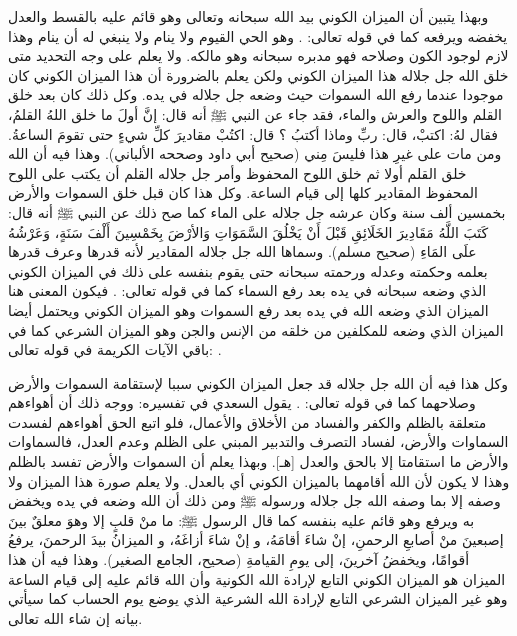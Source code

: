 وبهذا يتبين أن الميزان الكوني بيد الله سبحانه وتعالى وهو قائم عليه بالقسط والعدل يخفضه ويرفعه كما في قوله تعالى: 
\quranayah*[3][18]{\footnotesize \surahname*[3]}. وهو الحي القيوم ولا ينام ولا ينبغي له أن ينام وهذا لازم لوجود الكون وصلاحه فهو مدبره سبحانه وهو مالكه. ولا يعلم على وجه التحديد متى خلق الله جل جلاله هذا الميزان الكوني ولكن يعلم بالضرورة أن هذا الميزان الكوني كان موجودا عندما رفع الله السموات حيث وضعه جل جلاله في يده. وكل ذلك كان بعد خلق القلم واللوح والعرش والماء، فقد جاء عن النبي ﷺ أنه قال: إنَّ أولَ ما خلق اللهُ القلمُ، فقال لهُ: اكتبْ، قال: ربِّ وماذا أكتبُ ؟ قال: اكتُبْ مقاديرَ كلِّ شيءٍ حتى تقومَ الساعةُ. ومن مات على غيرِ هذا فليسَ مِني {\footnotesize (صحيح أبي داود وصححه الألباني)}. وهذا فيه أن الله خلق القلم أولا ثم خلق اللوح المحفوظ وأمر جل جلاله القلم أن يكتب على اللوح المحفوظ المقادير كلها إلى قيام الساعة. وكل هذا كان قبل خلق السموات والأرض بخمسين ألف سنة وكان عرشه جل جلاله على الماء كما صح ذلك عن النبي ﷺ أنه قال:  كَتَبَ اللَّهُ مَقَادِيرَ الخَلَائِقِ قَبْلَ أَنْ يَخْلُقَ السَّمَوَاتِ وَالأرْضَ بِخَمْسِينَ أَلْفَ سَنَةٍ، وَعَرْشُهُ علَى المَاءِ {\footnotesize (صحيح مسلم)}. وسماها الله جل جلاله المقادير لأنه قدرها وعرف قدرها بعلمه وحكمته وعدله ورحمته سبحانه حتى يقوم بنفسه على ذلك في الميزان الكوني الذي وضعه سبحانه في يده بعد رفع السماء كما في قوله تعالى: 
\quranayah*[55][7]{\footnotesize \surahname*[55]}. فيكون المعنى هنا الميزان الذي وضعه الله في يده بعد رفع السموات وهو الميزان الكوني ويحتمل أيضا الميزان الذي وضعه للمكلفين من خلقه من الإنس والجن وهو الميزان الشرعي كما في باقي الآيات الكريمة في قوله تعالى: 
\quranayah*[55][8-9]{\footnotesize \surahname*[55]}.

وكل هذا فيه أن الله جل جلاله قد جعل الميزان الكوني سببا لإستقامة السموات والأرض وصلاحهما كما في قوله تعالى:
\quranayah*[23][71]{\footnotesize \surahname*[23]}. يقول السعدي في تفسيره:
ووجه ذلك أن أهواءهم متعلقة بالظلم والكفر والفساد من الأخلاق والأعمال، فلو اتبع الحق أهواءهم لفسدت السماوات والأرض، لفساد التصرف والتدبير المبني على الظلم وعدم العدل، فالسماوات والأرض ما استقامتا إلا بالحق والعدل [هـ]. وبهذا يعلم أن السموات والأرض تفسد بالظلم وهذا لا يكون لأن الله أقامهما بالميزان الكوني أي بالعدل. ولا يعلم صورة هذا الميزان ولا وصفه إلا بما وصفه الله جل جلاله ورسوله ﷺ ومن ذلك أن الله وضعه في يده ويخفض به ويرفع وهو قائم عليه بنفسه كما قال الرسول ﷺ: 
ما منْ قلبٍ إلا وهوَ معلقٌ بينَ إصبعينَ منْ أصابعِ الرحمنِ، إنْ شاءَ أقامَهُ، و إنْ شاءَ أزاغَهُ، و الميزانُ بيدَ الرحمنَ، يرفعُ أقوامًا، ويخفضُ آخرينَ، إلى يومِ القيامةِ {\footnotesize (صحيح، الجامع الصغير)}. وهذا فيه أن هذا الميزان هو الميزان الكوني التابع لإرادة الله الكونية وأن الله قائم عليه إلى قيام الساعة وهو غير الميزان الشرعي التابع لإرادة الله الشرعية الذي يوضع يوم الحساب كما سيأتي بيانه إن شاء الله تعالى.

